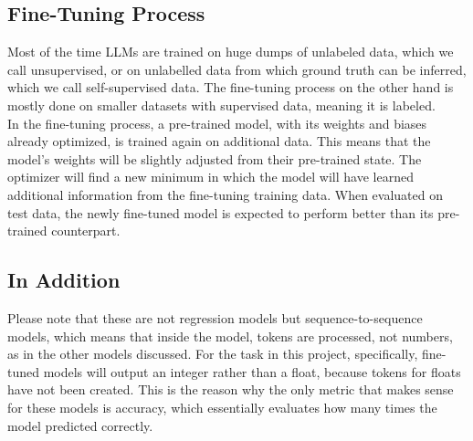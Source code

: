\documentclass{article}
\begin{document}
\subsection{Fine-Tuning Process}
Most of the time LLMs are trained on huge dumps of unlabeled data, which we call unsupervised, or on unlabelled data from which ground truth can be inferred, which we call self-supervised data. 
The fine-tuning process on the other hand is mostly done on smaller datasets with supervised data, meaning it is labeled.
\\[2em]
In the fine-tuning process, a pre-trained model, with its weights and biases already optimized, is trained again on additional data. This means that the model's weights will be slightly adjusted from their pre-trained state. The optimizer will find a new minimum in which the model will have learned additional information from the fine-tuning training data. When evaluated on test data, the newly fine-tuned model is expected to perform better than its pre-trained counterpart.

\subsection{In Addition}
Please note that these are not regression models but sequence-to-sequence models, which means that inside the model, tokens are processed, not numbers, as in the other models discussed. For the task in this project, specifically, fine-tuned models will output an integer rather than a float, because tokens for floats have not been created. This is the reason why the only metric that makes sense for these models is accuracy, which essentially evaluates how many times the model predicted correctly.

\newpage
\end{document}
